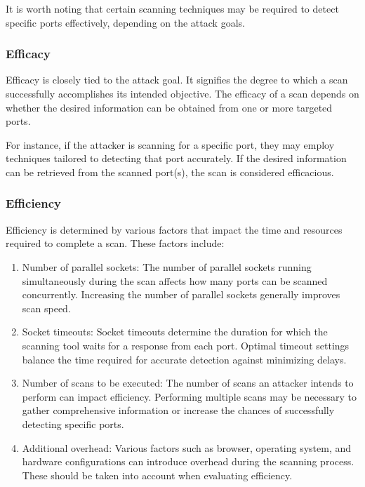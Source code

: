 It is worth noting that certain scanning techniques may be required to detect specific ports effectively, depending on the attack goals.

\subsubsection{Efficacy}

Efficacy is closely tied to the attack goal. It signifies the degree to which a scan successfully accomplishes its intended objective. The efficacy of a scan depends on whether the desired information can be obtained from one or more targeted ports.

For instance, if the attacker is scanning for a specific port, they may employ techniques tailored to detecting that port accurately. If the desired information can be retrieved from the scanned port(s), the scan is considered efficacious.

\subsubsection{Efficiency}

Efficiency is determined by various factors that impact the time and resources required to complete a scan. These factors include:

\begin{enumerate}[label=\alph*.]
    \item Number of parallel sockets: The number of parallel sockets running simultaneously during the scan affects how many ports can be scanned concurrently. Increasing the number of parallel sockets generally improves scan speed.
    
    \item Socket timeouts: Socket timeouts determine the duration for which the scanning tool waits for a response from each port. Optimal timeout settings balance the time required for accurate detection against minimizing delays.
    
    \item Number of scans to be executed: The number of scans an attacker intends to perform can impact efficiency. Performing multiple scans may be necessary to gather comprehensive information or increase the chances of successfully detecting specific ports.
    
    \item Additional overhead: Various factors such as browser, operating system, and hardware configurations can introduce overhead during the scanning process. These should be taken into account when evaluating efficiency.
\end{enumerate}


